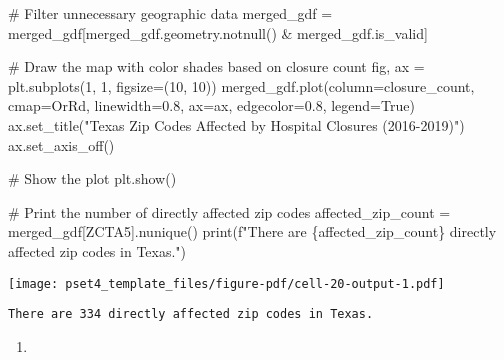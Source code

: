 \documentclass[
  letterpaper,
  DIV=11,
  numbers=noendperiod]{scrartcl}
\newenvironment{Shaded}{\begin{snugshade}}{\end{snugshade}}
\newcommand{\BuiltInTok}[1]{\textcolor[rgb]{0.00,0.23,0.31}{#1}}
\newcommand{\CommentTok}[1]{\textcolor[rgb]{0.37,0.37,0.37}{#1}}
\newcommand{\DecValTok}[1]{\textcolor[rgb]{0.68,0.00,0.00}{#1}}
\newcommand{\FloatTok}[1]{\textcolor[rgb]{0.68,0.00,0.00}{#1}}
\newcommand{\NormalTok}[1]{\textcolor[rgb]{0.00,0.23,0.31}{#1}}
\newcommand{\OperatorTok}[1]{\textcolor[rgb]{0.37,0.37,0.37}{#1}}
\newcommand{\SpecialCharTok}[1]{\textcolor[rgb]{0.37,0.37,0.37}{#1}}
\newcommand{\SpecialStringTok}[1]{\textcolor[rgb]{0.13,0.47,0.30}{#1}}
\newcommand{\StringTok}[1]{\textcolor[rgb]{0.13,0.47,0.30}{#1}}
\newcommand{\VariableTok}[1]{\textcolor[rgb]{0.07,0.07,0.07}{#1}}
\providecommand{\tightlist}{%
  \setlength{\itemsep}{0pt}\setlength{\parskip}{0pt}}\usepackage{longtable,booktabs,array}
\begin{document}
\begin{Shaded}
\begin{Highlighting}[]
\CommentTok{\# Filter unnecessary geographic data}
\NormalTok{merged\_gdf }\OperatorTok{=}\NormalTok{ merged\_gdf[merged\_gdf.geometry.notnull() }\OperatorTok{\&}\NormalTok{ merged\_gdf.is\_valid]}

\CommentTok{\# Draw the map with color shades based on closure count}
\NormalTok{fig, ax }\OperatorTok{=}\NormalTok{ plt.subplots(}\DecValTok{1}\NormalTok{, }\DecValTok{1}\NormalTok{, figsize}\OperatorTok{=}\NormalTok{(}\DecValTok{10}\NormalTok{, }\DecValTok{10}\NormalTok{))}
\NormalTok{merged\_gdf.plot(column}\OperatorTok{=}\StringTok{\textquotesingle{}closure\_count\textquotesingle{}}\NormalTok{, cmap}\OperatorTok{=}\StringTok{\textquotesingle{}OrRd\textquotesingle{}}\NormalTok{, linewidth}\OperatorTok{=}\FloatTok{0.8}\NormalTok{, ax}\OperatorTok{=}\NormalTok{ax, edgecolor}\OperatorTok{=}\StringTok{\textquotesingle{}0.8\textquotesingle{}}\NormalTok{, legend}\OperatorTok{=}\VariableTok{True}\NormalTok{)}
\NormalTok{ax.set\_title(}\StringTok{"Texas Zip Codes Affected by Hospital Closures (2016{-}2019)"}\NormalTok{)}
\NormalTok{ax.set\_axis\_off()}

\CommentTok{\# Show the plot}
\NormalTok{plt.show()}

\CommentTok{\# Print the number of directly affected zip codes}
\NormalTok{affected\_zip\_count }\OperatorTok{=}\NormalTok{ merged\_gdf[}\StringTok{\textquotesingle{}ZCTA5\textquotesingle{}}\NormalTok{].nunique()}
\BuiltInTok{print}\NormalTok{(}\SpecialStringTok{f"There are }\SpecialCharTok{\{}\NormalTok{affected\_zip\_count}\SpecialCharTok{\}}\SpecialStringTok{ directly affected zip codes in Texas."}\NormalTok{)}
\end{Highlighting}
\end{Shaded}

\texttt{[image: pset4\_template\_files/figure-pdf/cell-20-output-1.pdf]}

\begin{verbatim}
There are 334 directly affected zip codes in Texas.
\end{verbatim}

\begin{enumerate}
\def\labelenumi{\arabic{enumi}.}
\setcounter{enumi}{2}
\tightlist
\item
\end{enumerate}
\end{document}
